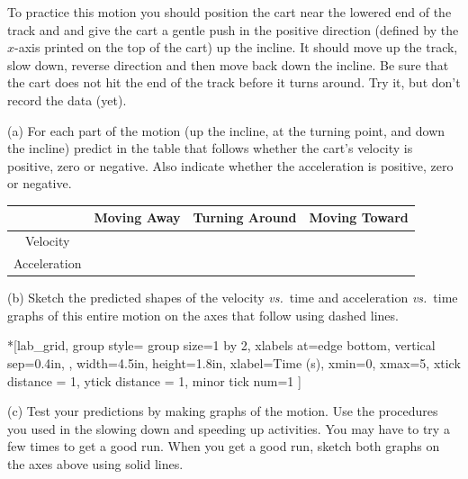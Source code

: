 To practice this motion you should position the cart near the lowered end of the track and
and give the cart a gentle push in the positive direction (defined by the $x$-axis printed on the top of the cart) up the incline. It should move up the track, slow down, reverse direction and then move back down the incline. Be sure that the cart does not hit the end of the track before it turns around. Try it, but don't record the data (yet).

(a) For each part of the motion (up the incline, at the turning point,
and down the incline) predict in the table that follows whether the cart's velocity
is positive, zero or negative. Also indicate whether the acceleration is
positive, zero or negative.

\vspace{0.3cm}
{\centering \begin{tabular}{|c|c|c|c|}
\hline 
&
Moving Away&
Turning Around&
Moving Toward\\
\hline 
Velocity&
&
&
\\
\hline 
Acceleration&
&
&
\\
\hline 
\end{tabular}\par}
\vspace{0.3cm}

(b) Sketch the predicted shapes of the velocity \textit{vs.}~time and acceleration 
\textit{vs.}~time graphs of this entire motion on the axes that follow using dashed lines.

\begin{lab_groupplot}*{}[lab_grid,
	group style={
		group size=1 by 2,
		xlabels at=edge bottom,
		vertical sep=0.4in,
		},
	width=4.5in,  height=1.8in,
	xlabel=Time (s),
	xmin=0, xmax=5,
	xtick distance = 1, 
	ytick distance = 1, 
	minor tick num=1
	]
\nextgroupplot[
	ymin=-1,ymax=1, 
	ylabel={Velocity (m/s)},
	]
\nextgroupplot[
	ymin=-1,ymax=1, 
	ylabel={Acceleration (m/s$^2$)},
	]
\end{lab_groupplot}

(c) Test your predictions by making graphs of the motion. Use the procedures
you used in the slowing down and speeding up activities. You may have to try
a few times to get a good run. When you get a good run, sketch both graphs on the axes above using solid lines.

